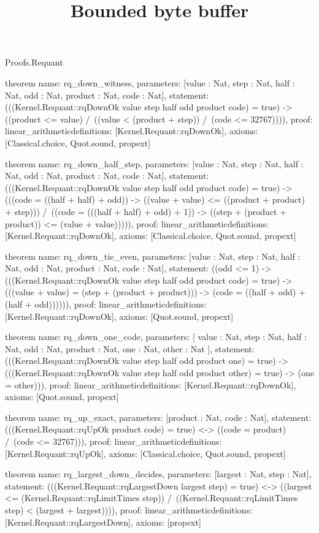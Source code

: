 \begin{lexlean}{Proofs.Requant}
\title{Bounded byte buffer}
\begin{semanticmodule}
theorem{
  name: rq_down_witness,
  parameters: [value : Nat, step : Nat, half : Nat, odd : Nat, product : Nat, code : Nat],
  statement: (((Kernel.Requant::rqDownOk value step half odd product code) = true) -> ((product <= value) /\ ((value < (product + step)) /\ (code <= 32767)))),
  proof: linear_arithmetic{definitions: [Kernel.Requant::rqDownOk]},
  axioms: [Classical.choice, Quot.sound, propext]
}

theorem{
  name: rq_down_half_step,
  parameters: [value : Nat, step : Nat, half : Nat, odd : Nat, product : Nat, code : Nat],
  statement: (((Kernel.Requant::rqDownOk value step half odd product code) = true) -> (((code = ((half + half) + odd)) -> ((value + value) <= ((product + product) + step))) /\ ((code = (((half + half) + odd) + 1)) -> ((step + (product + product)) <= (value + value))))),
  proof: linear_arithmetic{definitions: [Kernel.Requant::rqDownOk]},
  axioms: [Classical.choice, Quot.sound, propext]
}

theorem{
  name: rq_down_tie_even,
  parameters: [value : Nat, step : Nat, half : Nat, odd : Nat, product : Nat, code : Nat],
  statement: ((odd <= 1) -> (((Kernel.Requant::rqDownOk value step half odd product code) = true) -> (((value + value) = (step + (product + product))) -> (code = ((half + odd) + (half + odd)))))),
  proof: linear_arithmetic{definitions: [Kernel.Requant::rqDownOk]},
  axioms: [Quot.sound, propext]
}

theorem{
  name: rq_down_one_code,
  parameters: [
    value : Nat,
    step : Nat,
    half : Nat,
    odd : Nat,
    product : Nat,
    one : Nat,
    other : Nat
  ],
  statement: (((Kernel.Requant::rqDownOk value step half odd product one) = true) -> (((Kernel.Requant::rqDownOk value step half odd product other) = true) -> (one = other))),
  proof: linear_arithmetic{definitions: [Kernel.Requant::rqDownOk]},
  axioms: [Quot.sound, propext]
}

theorem{
  name: rq_up_exact,
  parameters: [product : Nat, code : Nat],
  statement: (((Kernel.Requant::rqUpOk product code) = true) <-> ((code = product) /\ (code <= 32767))),
  proof: linear_arithmetic{definitions: [Kernel.Requant::rqUpOk]},
  axioms: [Classical.choice, Quot.sound, propext]
}

theorem{
  name: rq_largest_down_decides,
  parameters: [largest : Nat, step : Nat],
  statement: (((Kernel.Requant::rqLargestDown largest step) = true) <-> ((largest <= (Kernel.Requant::rqLimitTimes step)) /\ ((Kernel.Requant::rqLimitTimes step) < (largest + largest)))),
  proof: linear_arithmetic{definitions: [Kernel.Requant::rqLargestDown]},
  axioms: [propext]
}


\end{semanticmodule}
\end{lexlean}
